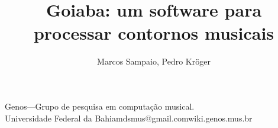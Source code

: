 \documentclass[12pt]{article}
\begin{document}
\title{Goiaba: um software para processar contornos musicais}

\author{Marcos Sampaio, Pedro Kröger}{Genos---Grupo de pesquisa em
  computação musical.\\Universidade Federal da Bahia}{mdsmus@gmail.com}{wiki.genos.mus.br}

\begin{sumario}
  
\end{sumario}



\begin{Abstract}
  
\end{Abstract}


\onehalfspacing



\singlespacing


\end{document}
